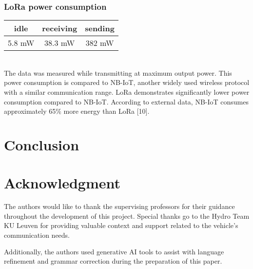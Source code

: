 \documentclass[conference]{IEEEtran}
\begin{document}
\subsubsection{LoRa power consumption}

\begin{tabular}{|c|c||c|}
  \hline
  \textbf{idle} & \textbf{receiving} & \textbf{sending} \\
  \hline
  5.8 mW & 38.3 mW & 382 mW \\
  \hline
\end{tabular} \\

The data was measured while transmitting at maximum output power.
This power consumption is compared to NB-IoT, another widely used wireless protocol with a similar communication range.
LoRa demonstrates significantly lower power consumption compared to NB-IoT.
According to external data, NB-IoT consumes approximately 65\% more energy than LoRa [10].

\section{Conclusion}

\section*{Acknowledgment}
The authors would like to thank the supervising professors for their guidance throughout the development of this project. Special thanks go to the Hydro Team KU Leuven for providing valuable context and support related to the vehicle's communication needs. 

Additionally, the authors used generative AI tools to assist with language refinement and grammar correction during the preparation of this paper.


\end{document}
